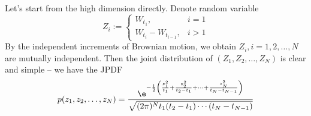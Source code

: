     \begin{subproblem}[\roman*)]
        \item
        Let's start from the high dimension directly.
        Denote random variable
        \[Z_i:=\begin{cases}
            W_{t_1},&i=1\\
            W_{t_i}-W_{t_{i-1}},&i>1
        \end{cases}\]
        By the independent increments of Brownian motion, we
        obtain $Z_i,i=1,2,\ldots,N$ are mutually independent.
        Then the joint distribution of $(Z_1,Z_2,\ldots,Z_N)$
        is clear and simple -- we have the JPDF
        \begin{equation*}
            p(z_1,z_2,\ldots,z_N)=
            \frac{\e^{-\frac{1}{2}\left(
                \frac{z_1^2}{t_1}
                +\frac{z_2^2}{t_2-t_1}
                +\cdots+\frac{z_N^2}{t_N-t_{N-1}}
            \right)}}{\sqrt{(2\pi)^Nt_1(t_2-t_1)\cdots(t_N-t_{N-1})}}
        \end{equation*}


\end{subproblem}

